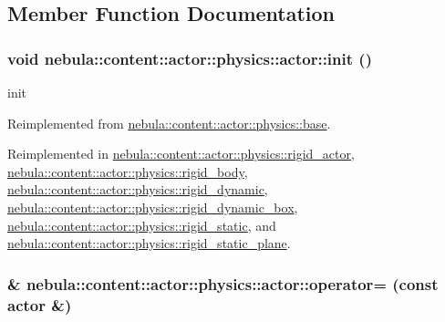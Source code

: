 \subsection{Member Function Documentation}
\hypertarget{classnebula_1_1content_1_1actor_1_1physics_1_1actor_a7ab3552a370009bff858cbff7245bc9c}{
\subsubsection[{init}]{\setlength{\rightskip}{0pt plus 5cm}void nebula::content::actor::physics::actor::init ()}}
\label{classnebula_1_1content_1_1actor_1_1physics_1_1actor_a7ab3552a370009bff858cbff7245bc9c}


init 

Reimplemented from \hyperlink{classnebula_1_1content_1_1actor_1_1physics_1_1base_a606d649258515421027e98aef1f91f7f}{nebula::content::actor::physics::base}.

Reimplemented in \hyperlink{classnebula_1_1content_1_1actor_1_1physics_1_1rigid__actor_a9c4d9fe73271ad35a646c95fc12b4cde}{nebula::content::actor::physics::rigid\_\-actor}, \hyperlink{classnebula_1_1content_1_1actor_1_1physics_1_1rigid__body_a858ee11f899acf3cc8f94eccf5713384}{nebula::content::actor::physics::rigid\_\-body}, \hyperlink{classnebula_1_1content_1_1actor_1_1physics_1_1rigid__dynamic_ae9450372c5f60103573ed626ffda9532}{nebula::content::actor::physics::rigid\_\-dynamic}, \hyperlink{classnebula_1_1content_1_1actor_1_1physics_1_1rigid__dynamic__box_a235e20a7e695a39c7ccb0100b90c10ee}{nebula::content::actor::physics::rigid\_\-dynamic\_\-box}, \hyperlink{classnebula_1_1content_1_1actor_1_1physics_1_1rigid__static_a37aa702d9a31ff9529659343c6155482}{nebula::content::actor::physics::rigid\_\-static}, and \hyperlink{classnebula_1_1content_1_1actor_1_1physics_1_1rigid__static__plane_ae7e418de928a5830a9e088bb843c95f0}{nebula::content::actor::physics::rigid\_\-static\_\-plane}.\hypertarget{classnebula_1_1content_1_1actor_1_1physics_1_1actor_abdcf4fcfdf017e71cea08a8c0341a4c8}{
\subsubsection[{operator=}]{\& nebula::content::actor::physics::actor::operator= (const {\bf actor} \&)}}
\label{classnebula_1_1content_1_1actor_1_1physics_1_1actor_abdcf4fcfdf017e71cea08a8c0341a4c8}


